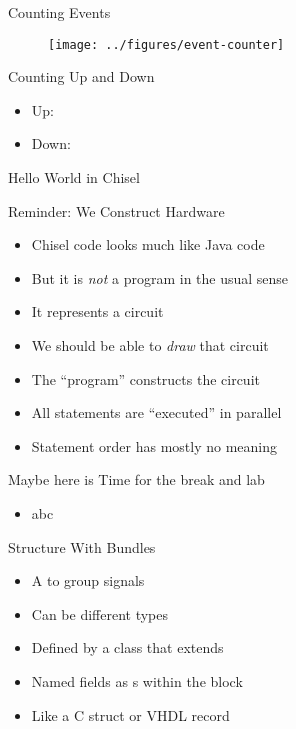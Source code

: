 \begin{frame}[fragile]{Counting Events}
\begin{figure}
  \texttt{[image: ../figures/event-counter]}
\end{figure}
\end{frame}


\begin{frame}[fragile]{Counting Up and Down}
\begin{itemize}
\item Up:
\item Down:
\end{itemize}
\end{frame}

\begin{frame}[fragile]{Hello World in Chisel}
\end{frame}

\begin{frame}[fragile]{Reminder: We Construct Hardware}
\begin{itemize}
\item Chisel code looks much like Java code
\item But it is \emph{not} a program in the usual sense
\item It represents a circuit
\item We should be able to \emph{draw} that circuit
\item The ``program'' constructs the circuit
\item All statements are ``executed'' in parallel
\item Statement order has mostly no meaning
\end{itemize}
\end{frame}



\begin{frame}[fragile]{Maybe here is Time for the break and lab}
\begin{itemize}
\item abc
\end{itemize}
\end{frame}



\begin{frame}[fragile]{Structure With Bundles}
\begin{itemize}
\item A  to group signals
\item Can be different types
\item Defined by a class that extends 
\item Named fields as s within the block
\item Like a C struct or VHDL record
\end{itemize}
\end{frame}

